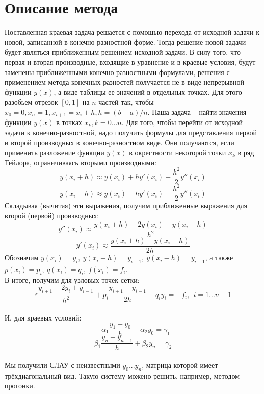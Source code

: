 \documentclass[a4paper,12pt]{extarticle}
\begin{document}
    \section{Описание метода}
    Поставленная краевая задача решается с помощью перехода от исходной
    задачи к новой, записанной в конечно-разностной форме. Тогда решение
    новой задачи будет являться приближенным решением исходной задачи. В
    силу того, что первая и вторая производные, входящие в уравнение и в
    краевые условия, будут заменены приближенными конечно-разностными
    формулами, решения с применением метода конечных разностей получается
    не в виде непрерывной функции $y(x)$, а виде таблицы ее значений в
    отдельных точках. Для этого разобьем отрезок $[0, 1]$ на $n$ частей 
    так, чтобы $x_0 = 0, x_n = 1, x_{i+1} = x_i + h, h = (b-a)/n$. Наша
    задача – найти значения функции $y(x)$ в точках $x_k, k=0...n$. Для
    того, чтобы перейти от исходной задачи к конечно-разностной, надо
    получить формулы для представления первой и второй производных в
    конечно-разностном виде. Они получаются, если применить разложение
    функции $y(x)$ в окрестности некоторой точки $x_k$ в ряд Тейлора,
    ограничиваясь вторыми производными:
    $$
    y(x_i + h) \approx y(x_i) + hy'(x_i) + \frac{h^2}{2}y''(x_i)
    $$
    $$
    y(x_i - h) \approx y(x_i) - hy'(x_i) + \frac{h^2}{2}y''(x_i)
    $$
    Складывая (вычитая) эти выражения, получим приближенные выражения для
    второй (первой) производных:
    $$
    y''(x_i) \approx \frac{y(x_i + h) - 2y(x_i) + y(x_i - h)}{h^2}
    $$
    $$
    y'(x_i) \approx \frac{y(x_i + h) - y(x_i - h)}{2h}
    $$
    Обозначим $y(x_i) = y_i,~ y(x_i +h) = y_{i+1},~ y(x_i -h) = y_{i-1}$, а также $p(x_i) = p_i, ~ q(x_i) = q_i, ~ f(x_i) = f_i$.\\
    В итоге, получим для узловых точек сетки:
    \begin{equation}
        \varepsilon \frac{y_{i+1} - 2y_i + y_{i-1}}{h^2} + p_i \frac{y_{i+1}-y_{i-1}}{2h} + q_i y_i = -f_i,  ~~ i = 1...n-1
    \end{equation}\\
    И, для краевых условий:
    \begin{equation}
        -\alpha_1\frac{y_{1}-y_{0}}{h} + \alpha_2 y_0 = \gamma_1
    \end{equation}
    \begin{equation}
        \beta_1\frac{y_{n}-y_{n-1}}{h} + \beta_2 y_n = \gamma_2
    \end{equation}\\
    Мы получили СЛАУ с неизвестными $y_0...y_n$, матрица которой имеет
    трёхдиагональный вид. Такую систему можено решить, например, методом
    прогонки.
    
\end{document}
